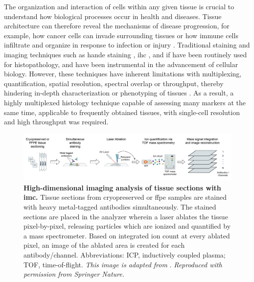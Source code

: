 
The organization and interaction of cells within any given tissue is crucial to understand how biological processes occur in health and diseases. Tissue architecture can therefore reveal the mechanisms of disease progression, for example, how cancer cells can invade surrounding tissues or how immune cells infiltrate and organize in response to infection or injury \textbf{\cite{veenstra_research_2021}}. Traditional staining and imaging techniques such as \gls{hande} staining \textbf{\cite{titford_progress_2009}}, \gls{ihc} \textbf{\cite{ortiz_hidalgo_immunohistochemistry_2022}}, and \gls{if} %
\textbf{\cite{odell_immunofluorescence_2013}} have been routinely used for histopathology, and have been instrumental in the advancement of cellular biology. However, these techniques have inherent limitations with multiplexing, quantification, spatial resolution, spectral overlap or throughput, thereby hindering in-depth characterization or phenotyping of tissues \textbf{\cite{veenstra_research_2021,leroux_imaging_2021}}. As a result, a highly multiplexed histology technique capable of assessing many markers at the same time, applicable to frequently obtained tissues, with single-cell resolution and high throughput was required.

\begin{figure}[H]
    \centering
    \includegraphics[width=\linewidth]{Chapter1/Fig/F1-12-01.png}
    \caption[Overview of  workflow]{\textbf{High-dimensional imaging analysis of tissue sections with \gls{imc}.} Tissue sections from cryopreserved or \gls{ffpe} samples are stained with heavy metal-tagged antibodies simultaneously. The stained sections are placed in the analyzer wherein a laser ablates the tissue pixel-by-pixel, releasing particles which are ionized and quantified by a mass spectrometer. Based on integrated ion count at every ablated pixel, an image of the ablated area is created for each antibody/channel. Abbreviations: ICP, inductively coupled plasma; TOF, time-of-flight. \textit{This image is adapted from }\textbf{\cite{damond_map_2019,hartmann_immune_2020}}. \textit{Reproduced with permission from Springer Nature.}}
    \label{fig:chp1_imc_workflow}
\end{figure}

